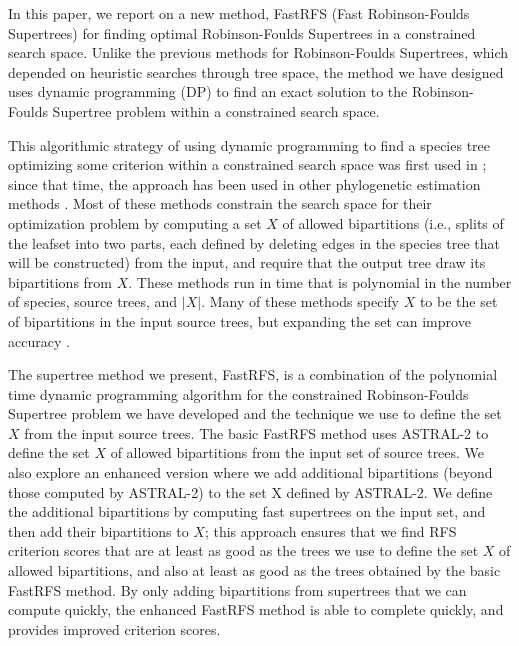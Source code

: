 In this paper, we report 
on a new method, FastRFS (Fast Robinson-Foulds Supertrees) for 
finding optimal Robinson-Foulds Supertrees in a constrained search space.
Unlike the previous methods for Robinson-Foulds Supertrees, which depended on heuristic searches through 
tree space, the method we have designed uses dynamic programming (DP) to 
find an exact solution to the Robinson-Foulds Supertree 
problem within a constrained search space. 

This algorithmic strategy
of using dynamic programming to find
a species tree optimizing some criterion within
a constrained search space
was first used
in 
\cite{hallett2000new};
since that time, the approach has been used in 
other phylogenetic estimation methods
\cite{bryant2001constructing,MDC,yu2011algorithms,bayzid2013inferring,ASTRAL,ASTRAL2}.
Most of these methods constrain the search
space for their
optimization problem by computing a set $X$ of allowed bipartitions
(i.e., splits of the leafset into two parts, each defined by
deleting edges in the species tree that will be constructed)
from the input, and require that the output tree 
draw its bipartitions from $X$.
These methods run in time that is polynomial in the 
number of species, source trees, and $|X|$.
Many of these methods
specify
$X$ to be  the set of bipartitions
in the input source trees, but expanding 
the set
can improve accuracy \cite{ASTRAL2}.


The supertree method we present, FastRFS,
is a combination
of the polynomial time dynamic programming algorithm for
the constrained Robinson-Foulds Supertree problem
we have developed and the technique we use
to define the set $X$ from the input source trees.
The basic FastRFS method uses  
ASTRAL-2
to define the set $X$ of allowed bipartitions
from the input set of source trees.
We also explore an enhanced version where we add additional
 bipartitions (beyond those computed by ASTRAL-2)
to the set X defined by ASTRAL-2. We define the additional
bipartitions by computing fast supertrees on the input
set, and then add their bipartitions to $X$;
this
 approach ensures that we find
RFS criterion scores that are at least as good as the trees we use
to define the set $X$ of allowed
bipartitions,
and also at least as good as the trees obtained by the 
basic
FastRFS method.
By only adding bipartitions from supertrees that we 
can compute quickly, the enhanced FastRFS method is able to complete
quickly, and provides improved criterion scores.

